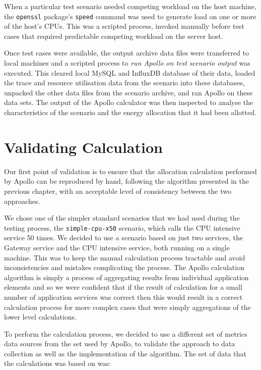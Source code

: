 When a particular test scenario needed competing workload on the host machine, the \texttt{openssl} package's \texttt{speed} command was used to generate load on one or more of the host's CPUs.  This was a scripted process, invoked manually before test cases that required predictable competing workload on the server host.

Once test cases were available, the output archive data files were transferred to local machines and a scripted process to \emph{run Apollo on test scenario output} was executed. This cleared local MySQL and InfluxDB database of their data, loaded the trace and resource utilisation data from the scenario into these databases, unpacked the other data files from the scenario archive, and ran Apollo on these data sets.  The output of the Apollo calculator was then inspected to analyse the characteristics of the scenario and the energy allocation that it had been allotted.


\section{Validating Calculation}
\label{sec:validatingcalculation}

Our first point of validation is to ensure that the allocation calculation performed by Apollo can be reproduced by hand, following the algorithm presented in the previous chapter, with an acceptable level of consistency between the two approaches.

We chose one of the simpler standard scenarios that we had used during the testing process, the \texttt{simple-cpu-x50} scenario, which calls the CPU intensive service 50 times.  We decided to use a scenario based on just two services, the Gateway service and the CPU intensive service, both running on a single machine.  This was to keep the manual calculation process tractable and avoid inconsistencies and mistakes complicating the process.  The Apollo calculation algorithm is simply a process of aggregating results from individual application elements and so we were confident that if the result of calculation for a small number of application services was correct then this would result in a correct calculation process for more complex cases that were simply aggregations of the lower level calculations.

To perform the calculation process, we decided to use a different set of metrics data sources from the set used by Apollo, to validate the approach to data collection as well as the implementation of the algorithm.  The set of data that the calculations was based on was:



